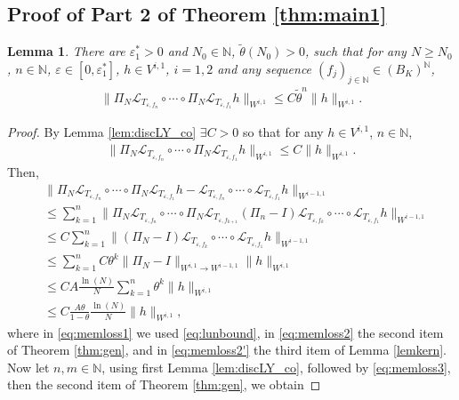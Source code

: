 \documentclass[12pt]{article}
\def\L{\mathcal{L}}
\newcommand{\eps}{\varepsilon}
\theoremstyle{plain}
\newtheorem{lemma}[theorem]{Lemma}
\begin{document}
\subsection{Proof of Part 2 of Theorem \ref{thm:main1}}

{
\begin{lemma}\label{lem:contracto}
There are $\eps_1^*>0$ and $N_0\in \mathbb N$, $\tilde \theta (N_0) >0$, such that for any $N\geq N_0$, $n\in\mathbb{N}$, $\eps\in[0,\eps_1^*]$, $h\in V^{i,1}$, $i=1,2$ and any sequence  $(f_j)_{j\in \mathbb{N}} \in (B_K)^{\mathbb{N}}$,
\begin{align*}
    \|\Pi_N\L_{T_{\eps,f_n}}\circ\cdots \circ \Pi_N\L_{T_{\eps, f_1}}h\|_{W^{i,1}}\le C \tilde \theta^n\|h\|_{W^{i,1}}.
\end{align*}
\end{lemma}
\begin{proof}
By Lemma \ref{lem:discLY_co}  $\exists C>0$ so that for any $h\in V^{i,1}$, $n\in \mathbb N$,
\begin{align}\label{eq:lunbound}
    \|\Pi_N\L_{T_{\eps,f_n}}\circ\cdots \circ \Pi_N\L_{T_{\eps, f_1}}h\|_{W^{i,1}}\leq C \|h\|_{W^{i,1}}.
\end{align}
Then,
\begin{align}
    &\|\Pi_N\L_{T_{\eps,f_n}}\circ\cdots \circ \Pi_N\L_{T_{\eps, f_1}}h-\L_{T_{\eps,f_n}}\circ\cdots \circ\L_{T_{\eps, f_1}}h\|_{W^{i-1, 1}}\nonumber\\
    &\leq \sum_{k=1}^{n}\|\Pi_N\L_{T_{\eps,f_n}}\circ\cdots \circ \Pi_N\L_{T_{\eps, f_{k+1}}}
    \left(\Pi_n-I\right)\L_{T_{\eps,f_{k}}}\circ\cdots \circ\L_{T_{\eps, f_1}}h\|_{W^{i-1, 1}}\nonumber\\
    &\leq C\sum_{k=1}^{n}\|(\Pi_N-I)\L_{T_{\eps,f_{k}}}\circ\cdots \circ\L_{T_{\eps, f_1}}h\|_{W^{i-1, 1}}\label{eq:memloss1}\\
    &\leq \sum_{k=1}^{n}C\theta^{k}\|\Pi_N-I\|_{W^{i,1}\to{W^{i-1,1}} }\|h\|_{W^{i,1}}\label{eq:memloss2}\\
    &\leq CA \frac{\ln(N)}{N}\sum_{k=1}^{n}\theta^{k}\|h\|_{W^{i,1}}\label{eq:memloss2'}\\
    &\leq C\frac{A\theta}{1-\theta} \frac{\ln(N)}{N}\|h\|_{W^{i,1}},\label{eq:memloss3}
\end{align}
where in \eqref{eq:memloss1} we used \eqref{eq:lunbound}, in \eqref{eq:memloss2} the second item of Theorem \ref{thm:gen}, and in \eqref{eq:memloss2'} the third item of Lemma \ref{lemkern}.
Now let $n,m\in \mathbb N$, using first Lemma \ref{lem:discLY_co}, followed by \eqref{eq:memloss3}, then the second item of Theorem \ref{thm:gen}, we obtain

\end{proof}}
\end{document}
